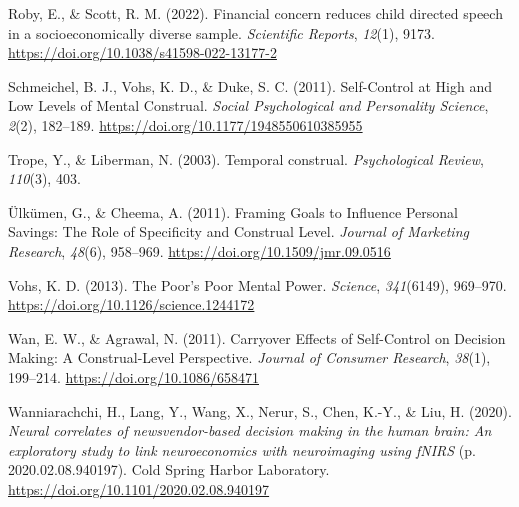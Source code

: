 \documentclass[
  letterpaper,
  DIV=11,
  numbers=noendperiod]{scrartcl}
\newlength{\cslhangindent}
\newlength{\cslentryspacingunit} %
\newenvironment{CSLReferences}[2] %
 {%
  \setlength{\parindent}{0pt}
  \ifodd #1
  \let\oldpar\par
  \def\par{\hangindent=\cslhangindent\oldpar}
  \fi
  \setlength{\parskip}{#2\cslentryspacingunit}
 }%
 {}
\begin{document}
\begin{CSLReferences}{1}{0}
\leavevmode{}%
Roby, E., \& Scott, R. M. (2022). Financial concern reduces child
directed speech in a socioeconomically diverse sample. \emph{Scientific
Reports}, \emph{12}(1), 9173.
\url{https://doi.org/10.1038/s41598-022-13177-2}

\leavevmode{}%
Schmeichel, B. J., Vohs, K. D., \& Duke, S. C. (2011). Self-{Control} at
{High} and {Low Levels} of {Mental Construal}. \emph{Social
Psychological and Personality Science}, \emph{2}(2), 182--189.
\url{https://doi.org/10.1177/1948550610385955}

\leavevmode{}%
Trope, Y., \& Liberman, N. (2003). Temporal construal.
\emph{Psychological Review}, \emph{110}(3), 403.

\leavevmode{}%
Ülkümen, G., \& Cheema, A. (2011). Framing {Goals} to {Influence
Personal Savings}: {The Role} of {Specificity} and {Construal Level}.
\emph{Journal of Marketing Research}, \emph{48}(6), 958--969.
\url{https://doi.org/10.1509/jmr.09.0516}

\leavevmode{}%
Vohs, K. D. (2013). The {Poor}'s {Poor Mental Power}. \emph{Science},
\emph{341}(6149), 969--970.
\url{https://doi.org/10.1126/science.1244172}

\leavevmode{}%
Wan, E. W., \& Agrawal, N. (2011). Carryover {Effects} of {Self-Control}
on {Decision Making}: {A Construal-Level Perspective}. \emph{Journal of
Consumer Research}, \emph{38}(1), 199--214.
\url{https://doi.org/10.1086/658471}

\leavevmode{}%
Wanniarachchi, H., Lang, Y., Wang, X., Nerur, S., Chen, K.-Y., \& Liu,
H. (2020). \emph{Neural correlates of newsvendor-based decision making
in the human brain: {An} exploratory study to link neuroeconomics with
neuroimaging using {fNIRS}} (p. 2020.02.08.940197). {Cold Spring Harbor
Laboratory}. \url{https://doi.org/10.1101/2020.02.08.940197}

\end{CSLReferences}
\end{document}
